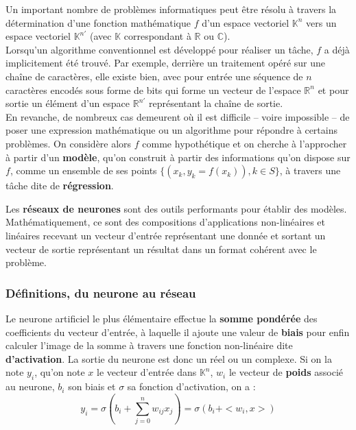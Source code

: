 \documentclass[12pt, french, twoside]{report}
\begin{document}
Un important nombre de problèmes informatiques peut être résolu à travers la détermination d'une fonction mathématique $f$ d'un espace vectoriel $\mathbb{K}^n$ vers un espace vectoriel $\mathbb{K}^{n'}$ (avec $\mathbb{K}$ correspondant à $\mathbb{R}$ ou $\mathbb{C}$).\\
Lorsqu'un algorithme conventionnel est développé pour réaliser un tâche, $f$ a déjà implicitement été trouvé. Par exemple, derrière un traitement opéré sur une chaîne de caractères, elle existe bien, avec pour entrée une séquence de $n$ caractères encodés sous forme de bits qui forme un vecteur de l'espace $\mathbb{R}^n$ et pour sortie un élément d'un espace $\mathbb{R}^{n'}$ représentant la chaîne de sortie.\\
En revanche, de nombreux cas demeurent où il est difficile -- voire impossible -- de poser une expression mathématique ou un algorithme pour répondre à certains problèmes. On considère alors $f$ comme hypothétique et on cherche à l'approcher à partir d'un \textbf{modèle}, qu'on construit à partir des informations qu'on dispose sur $f$, comme un ensemble de ses points $\{(x_k, y_k=f(x_k)), k \in S\}$, à travers une tâche dite de \textbf{régression}.

\vspace{12pt}
Les \textbf{réseaux de neurones} sont des outils performants pour établir des modèles. Mathématiquement, ce sont des compositions d'applications non-linéaires et linéaires recevant un vecteur d'entrée représentant une donnée et sortant un vecteur de sortie représentant un résultat dans un format cohérent avec le problème.

\subsubsection{Définitions, du neurone au réseau}
Le neurone artificiel le plus élémentaire effectue la \textbf{somme pondérée} des coefficients du vecteur d'entrée, à laquelle il ajoute une valeur de \textbf{biais} pour enfin calculer l'image de la somme à travers une fonction non-linéaire dite \textbf{d'activation}. La sortie du neurone est donc un réel ou un complexe. Si on la note $y_i$, qu'on note $x$ le vecteur d'entrée dans $\mathbb{K}^n$, $w_i$ le vecteur de \textbf{poids} associé au neurone, $b_i$ son biais et $\sigma$ sa fonction d'activation, on a :
\begin{equation}
    y_i = \sigma(b_i + \sum_{j=0}^{n} w_{ij}x_j) = \sigma(b_i + <w_i, x>)
\end{equation}\cite[section 1]{jurafsky_ffnn}
\end{document}
